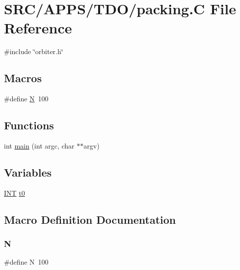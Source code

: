 \hypertarget{_a_p_p_s_2_t_d_o_2packing_8_c}{}\section{S\+R\+C/\+A\+P\+P\+S/\+T\+D\+O/packing.C File Reference}
\label{_a_p_p_s_2_t_d_o_2packing_8_c}
{\ttfamily \#include \char`\"{}orbiter.\+h\char`\"{}}\newline
\subsection*{Macros}
\begin{DoxyCompactItemize}
\item 
\#define \mbox{\hyperlink{_a_p_p_s_2_t_d_o_2packing_8_c_a0240ac851181b84ac374872dc5434ee4}{N}}~100
\end{DoxyCompactItemize}
\subsection*{Functions}
\begin{DoxyCompactItemize}
\item 
int \mbox{\hyperlink{_a_p_p_s_2_t_d_o_2packing_8_c_a3c04138a5bfe5d72780bb7e82a18e627}{main}} (int argc, char $\ast$$\ast$argv)
\end{DoxyCompactItemize}
\subsection*{Variables}
\begin{DoxyCompactItemize}
\item 
\mbox{\hyperlink{galois_8h_a09fddde158a3a20bd2dcadb609de11dc}{I\+NT}} \mbox{\hyperlink{_a_p_p_s_2_t_d_o_2packing_8_c_a4268f4fe222ffb119218a0199f5e1904}{t0}}
\end{DoxyCompactItemize}


\subsection{Macro Definition Documentation}
\mbox{\label{_a_p_p_s_2_t_d_o_2packing_8_c_a0240ac851181b84ac374872dc5434ee4}} 
\subsubsection{\texorpdfstring{N}{N}}
{\footnotesize\ttfamily \#define N~100}



